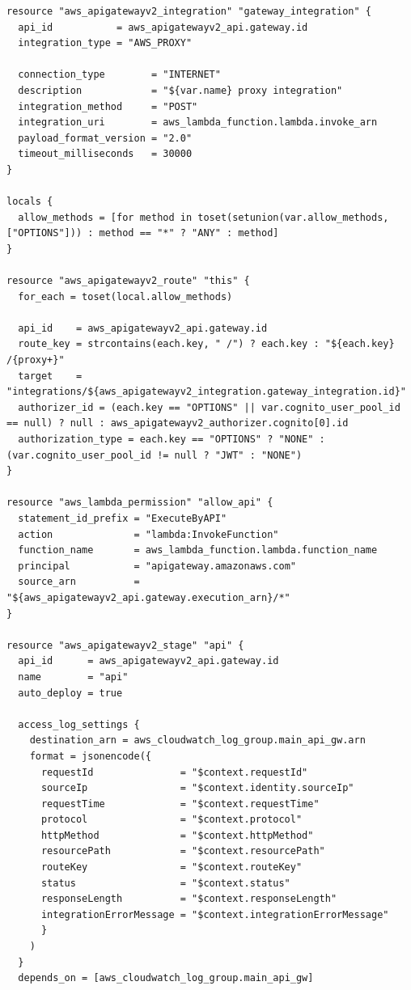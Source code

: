 \begin{lstlisting}[language=HCL, label={lst:gateway-core}]
resource "aws_apigatewayv2_integration" "gateway_integration" {
  api_id           = aws_apigatewayv2_api.gateway.id
  integration_type = "AWS_PROXY"

  connection_type        = "INTERNET"
  description            = "${var.name} proxy integration"
  integration_method     = "POST"
  integration_uri        = aws_lambda_function.lambda.invoke_arn
  payload_format_version = "2.0"
  timeout_milliseconds   = 30000
}

locals {
  allow_methods = [for method in toset(setunion(var.allow_methods, ["OPTIONS"])) : method == "*" ? "ANY" : method]
}

resource "aws_apigatewayv2_route" "this" {
  for_each = toset(local.allow_methods)

  api_id    = aws_apigatewayv2_api.gateway.id
  route_key = strcontains(each.key, " /") ? each.key : "${each.key} /{proxy+}"
  target    = "integrations/${aws_apigatewayv2_integration.gateway_integration.id}"
  authorizer_id = (each.key == "OPTIONS" || var.cognito_user_pool_id == null) ? null : aws_apigatewayv2_authorizer.cognito[0].id
  authorization_type = each.key == "OPTIONS" ? "NONE" : (var.cognito_user_pool_id != null ? "JWT" : "NONE")
}

resource "aws_lambda_permission" "allow_api" {
  statement_id_prefix = "ExecuteByAPI"
  action              = "lambda:InvokeFunction"
  function_name       = aws_lambda_function.lambda.function_name
  principal           = "apigateway.amazonaws.com"
  source_arn          = "${aws_apigatewayv2_api.gateway.execution_arn}/*"
}

resource "aws_apigatewayv2_stage" "api" {
  api_id      = aws_apigatewayv2_api.gateway.id
  name        = "api"
  auto_deploy = true

  access_log_settings {
    destination_arn = aws_cloudwatch_log_group.main_api_gw.arn
    format = jsonencode({
      requestId               = "$context.requestId"
      sourceIp                = "$context.identity.sourceIp"
      requestTime             = "$context.requestTime"
      protocol                = "$context.protocol"
      httpMethod              = "$context.httpMethod"
      resourcePath            = "$context.resourcePath"
      routeKey                = "$context.routeKey"
      status                  = "$context.status"
      responseLength          = "$context.responseLength"
      integrationErrorMessage = "$context.integrationErrorMessage"
      }
    )
  }
  depends_on = [aws_cloudwatch_log_group.main_api_gw]


\end{lstlisting}
